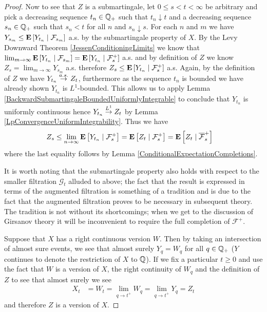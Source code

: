 \begin{proof}
Now to see that $Z$ is a submartingale, let $0 \leq s < t < \infty$ be
arbitrary and pick a decreasing sequence $t_n \in \rationals_+$
such that $t_n \downarrow t$ and a decreasing sequence $s_n \in
\rationals_+$ such that $s_n < t$ for all $n$ and  $s_n \downarrow s$.
For each $n$ and $m$ we have
$Y_{s_m} \leq \cexpectationlong{\mathcal{F}_{s_m}}{Y_{t_n}}$ a.s. by the
submartingale property of $X$.  By the Levy Downward Theorem
\ref{JessenConditioningLimits} we know that $\lim_{m \to \infty}
\cexpectationlong{\mathcal{F}_{s_m}}{Y_{t_n}} =
\cexpectationlong{\mathcal{F}^+_{s}}{Y_{t_n}}$ a.s. and by definition
of $Z$ we know
$Z_s = \lim_{m \to \infty} Y_{s_m}$ a.s. therefore $Z_s
\leq \cexpectationlong{\mathcal{F}^+_{s}}{Y_{t_n}}$ a.s.
Again, by the definition  of $Z$ we have $Y_{t_n} \toas Z_t$, furthermore as the sequence $t_n$ is bounded
we have already shown
$Y_{t_n}$ is $L^1$-bounded.  This allows us to apply Lemma
\ref{BackwardSubmartingaleBoundedUniformlyIntegrable} to conclude that
$Y_{t_n}$ is uniformly continuous hence $Y_{t_n} \tolp{1} Z_t$ by
Lemma \ref{LpConvergenceUniformIntegrability}.  Thus we have 
\begin{align*}
Z_s &\leq \lim_{n \to \infty}
\cexpectationlong{\mathcal{F}^+_s}{Y_{t_n}} =
\cexpectationlong{\mathcal{F}^+_s}{Z_{t}} =
\cexpectationlong{\overline{\mathcal{F}}^+_s}{Z_{t}}
\end{align*}
where the last equality follows by Lemma \ref{ConditionalExpectationCompletions}.

It is worth noting that the submartingale property also holds with
respect to the smaller filtration $\mathcal{G}_t$ alluded to above; the fact that the result is
expressed in terms of the augmented filtration is something of a
tradition and is due to the fact that
the augmented filtration proves to be necessary in subsequent theory.
The tradition is not without its shortcomings; when we get to the
discussion of Girsanov theory it will be
inconvenient to require the full completion of $\mathcal{F}^+$.

Suppose that $X$ has a right continuous version $W$.  Then by
taking an intersection of almost sure events, we see that almost
surely $Y_q = W_q$ for all $q \in \rationals_+$ ($Y$ continues to
denote the restriction of $X$ to $\rationals$).  If we fix a
particular $t \geq 0$ and use the fact that $W$ is a version
of $X$, the right continuity of $W_q$ and the definition of $Z$ to
see that almost surely we see
\begin{align*}
X_t &= W_t = \lim_{q \to t^+} W_q = \lim_{q \to t^+} Y_q = Z_t
\end{align*}
and therefore $Z$ is a version of $X$.


\end{proof}
